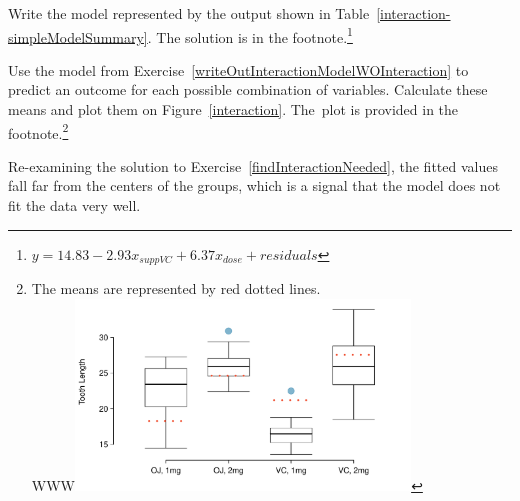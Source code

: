 \begin{exercise}\label{writeOutInteractionModelWOInteraction}
Write the model represented by the output shown in Table~\ref{interaction-simpleModelSummary}. The solution is in the footnote.\footnote{$y = 14.83 - 2.93x_{suppVC} + 6.37x_{dose} + residuals$}
\end{exercise}

\begin{exercise}\label{findInteractionNeeded}
Use the model from Exercise~\ref{writeOutInteractionModelWOInteraction} to predict an outcome for each possible combination of variables. Calculate these means and plot them on Figure~\ref{interaction}. The~plot is provided in the footnote.\footnote{The means are represented by red dotted lines.\\\color{white}WWW\includegraphics[width=0.7\textwidth]{RegressionExtras/figures/interaction/interaction-noint-w-mean}}
\end{exercise}

Re-examining the solution to Exercise~\ref{findInteractionNeeded}, the fitted values fall far from the centers of the groups, which is a signal that the model does not fit the data very well.

